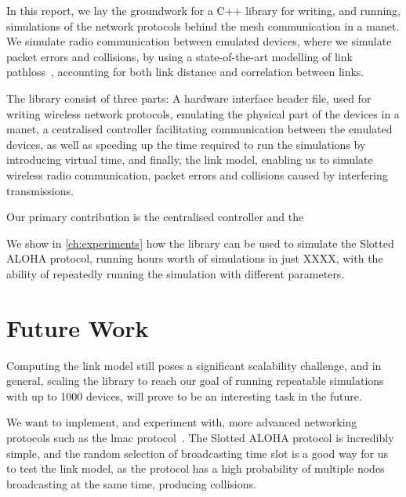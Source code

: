 In this report, we lay the groundwork for a C++ library for writing, and running, simulations of the network protocols behind the mesh communication in a \gls{manet}. We simulate radio communication between emulated devices, where we simulate packet errors and collisions, by using a state-of-the-art modelling of link \gls{pathloss}~\cite{paper:linkmodel}, accounting for both link distance and correlation between links. \smallbreak

The library consist of three parts: A hardware interface header file, used for writing wireless network protocols, emulating the physical part of the devices in a \gls{manet}, a centralised controller facilitating communication between the emulated devices, as well as speeding up the time required to run the simulations by introducing virtual time, and finally, the link model, enabling us to simulate wireless radio communication, packet errors and collisions caused by interfering transmissions.\smallbreak

Our primary contribution is the centralised controller and the 

We show in \autoref{ch:experiments} how the library can be used to simulate the Slotted ALOHA protocol, running hours worth of simulations in just XXXX, with the ability of repeatedly running the simulation with different parameters.\smallbreak


\section{Future Work}\label{sec:futurework}
Computing the link model still poses a significant scalability challenge, and in general, scaling the library to reach our goal of running repeatable simulations with up to 1000 devices, will prove to be an interesting task in the future.\smallbreak

We want to implement, and experiment with, more advanced networking protocols such as the \gls{lmac} protocol~\cite{paper:lmac_protocol}. The Slotted ALOHA protocol is incredibly simple, and the random selection of broadcasting time slot is a good way for us to test the link model, as the protocol has a high probability of multiple nodes broadcasting at the same time, producing collisions.\smallbreak

